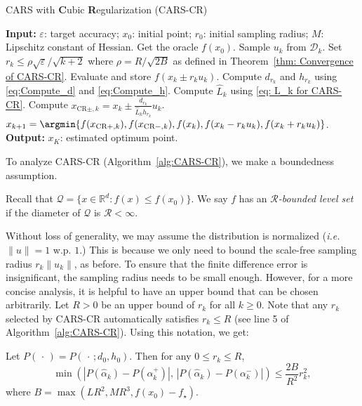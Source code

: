 \begin{algorithm}
    \caption{CARS with \textbf{C}ubic \textbf{R}egularization (CARS-CR)}
    \label{alg:CARS-CR}
    \begin{algorithmic}[1]
        \State \textbf{Input:}  $\varepsilon$: target accuracy; $x_0$: initial point; $r_0$: initial sampling radius; $M$: Lipschitz constant of Hessian.
        \State Get the oracle $f(x_0)$.
        \State Sample $u_k$ from $\mathcal{D}_k$.
        \State Set $r_k \leq \rho\sqrt{\varepsilon}/\sqrt{k+2}$ where $\rho = R/\sqrt{2B}$ as defined in Theorem~\ref{thm: Convergence of CARS-CR}.
        \State Evaluate and store $f(x_{k} \pm r_k u_k)$.
        \State Compute $d_{r_k}$ and $h_{r_k}$ using \eqref{eq:Compute_d} and \eqref{eq:Compute_h}.
        \State Compute $\hat{L}_k$ using \eqref{eq: L_k for CARS-CR}.
        \State Compute $x_{\textrm{CR}\pm, k} = x_{k} \pm \frac{d_{r_k}}{\hat{L}_kh_{r_k}}u_k$.
        \State $x_{k+1} = \argmin\{f(x_{\textrm{CR}+, k}), f(x_{\textrm{CR}-, k}),f(x_k), f(x_{k} - r_k u_k), f(x_{k} + r_k u_k) \}$.
        \EndFor
        \State \textbf{Output:} $x_K$: estimated optimum point.
    \end{algorithmic}
\end{algorithm}

To analyze CARS-CR (Algorithm~\ref{alg:CARS-CR}), we make a boundedness assumption.
\begin{definition}
    \label{def:R-bounded}
    Recall that $\mathcal{Q} = \{x \in \mathbb{R}^d : f(x) \leq f(x_0)\}$. We say $f$ has an {\em $\mathcal{R}$-bounded level set} if the diameter of $\mathcal{Q}$ is $\mathcal{R} < \infty$.
\end{definition}
Without loss of generality, we may assume the distribution is normalized ({\em i.e.} $\|u\|=1$ w.p. $1$.) This is because we only need to bound the scale-free sampling radius $r_k\|u_k\|$, as before.
To ensure that the finite difference error is insignificant, the sampling radius needs to be small enough. However, for a more concise analysis, it is helpful to have an upper bound that can be chosen arbitrarily. Let $R>0$ be an upper bound of $r_k$ for all $k\geq0$. Note that any $r_k$ selected by CARS-CR automatically satisfies $r_k \leq R$ (see line 5 of Algorithm~\ref{alg:CARS-CR}). Using this notation, we get:

\begin{lemma}
    \label{cor: P finite difference error bound}
    Let $P(\,\cdot\,) = P(\,\cdot\,;d_0, h_0)$. Then for any $0 \leq r_k \leq R$,
    \begin{equation}
        \min(|P(\hat{\alpha}_k) - P(\alpha_k^+)|,\, |P(\hat{\alpha}_k) - P(\alpha_k^-)|) \leq \frac{2B}{R^2}r_k^2,
        \label{eq: P_0_perturbation}
    \end{equation}
    where $B = \max(LR^2, MR^3, f(x_0) - f_\star)$.
\end{lemma}

